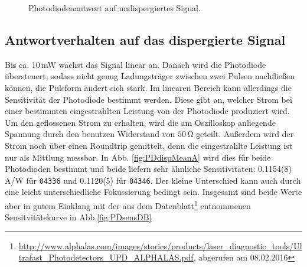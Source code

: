 \documentclass[bachelor,       %
               twoside,        %
               BCOR10mm,       %
               liststotoc,nomtotoc,bibtotoc, %
               english,ngerman, %
               final,          %
               ]{GAUBM}
\begin{document}
\begin{figure}[!htb]
	\centering
   \hfill
	\caption{Photodiodenantwort auf undispergiertes Signal.}
	\label{fig:PDundisp}
\end{figure}


\subsection{Antwortverhalten auf das dispergierte Signal}
Bis ca. 10\,mW wächst das Signal linear an.
Danach wird die Photodiode übersteuert, sodass nicht genug Ladungsträger zwischen zwei Pulsen nachfließen können, die Pulsform ändert sich stark.
Im linearen Bereich kann allerdings die Sensitivität der Photodiode bestimmt werden.
Diese gibt an, welcher Strom bei einer bestimmten eingestrahlten Leistung von der Photodiode produziert wird.
Um den geflossenen Strom zu erhalten, wird die am Oszilloskop anliegende Spannung durch den benutzen Widerstand von $50\,\si\ohm$ geteilt.
Außerdem wird der Strom noch über einen Roundtrip gemittelt, denn die eingestrahlte Leistung ist nur als Mittlung messbar.
In Abb. \ref{fig:PDdispMeanA} wird dies für beide Photodioden bestimmt und beide liefern sehr ähnliche Sensitivitäten: 0.1154(8)\,A/W für  \texttt{04336} und  0.1120(5) für \texttt{04346}.
Der kleine Unterschied kann auch durch eine leicht unterschiedliche Fokussierung bedingt sein.
Insgesamt sind beide Werte aber in gutem Einklang mit der aus dem Datenblatt\footnote{\url{http://www.alphalas.com/images/stories/products/laser_diagnostic_tools/Ultrafast_Photodetectors_UPD_ALPHALAS.pdf}, abgerufen am 08.02.2016} entnommenen Sensitvitätskurve in Abb.\ref{fig:PDsensDB}
\end{document}

